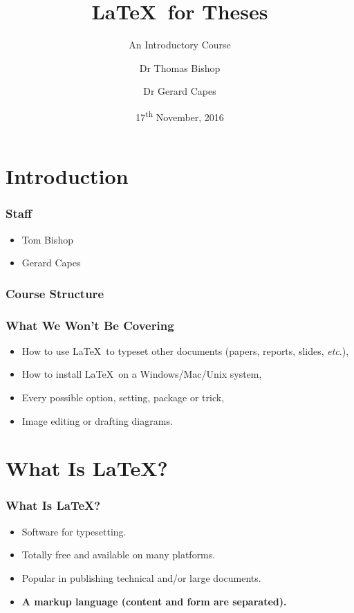 \documentclass{beamer}
\title{\LaTeX \ for Theses}
\subtitle{An Introductory Course}
\author{Dr Thomas Bishop \and Dr Gerard Capes}
\institute{University of Manchester}
\date{17\textsuperscript{th} November, 2016}
\begin{document}
\begin{frame}
\titlepage
\end{frame}

\section{Introduction}

\begin{frame}
\frametitle{Staff}
\begin{itemize}
	\item Tom Bishop
	\item Gerard Capes
\end{itemize}
\end{frame}

\begin{frame}
\frametitle{Course Structure}
\tableofcontents
\end{frame}

\begin{frame}
\frametitle{What We \textbf{Won't} Be Covering}
\begin{itemize}
	\item How to use \LaTeX \ to typeset other documents (papers, reports, slides, \textit{etc}.),
	\item How to install \LaTeX \ on a Windows/Mac/Unix system,
	\item Every possible option, setting, package or trick,
	\item Image editing or drafting diagrams.
\end{itemize}
\end{frame}

\section{What Is \LaTeX?}

\begin{frame}
\frametitle{What Is \LaTeX?}
\begin{itemize}
	\item Software for typesetting.
	\item Totally free and available on many platforms.
	\item Popular in publishing technical and/or large documents.
	\item \textbf{A markup language (content and form are separated).}
\end{itemize}
\end{frame}
\end{document}
